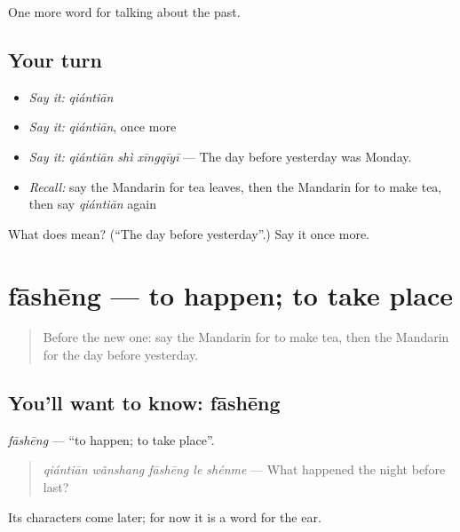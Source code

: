 \begin{grammarlens}[title={What you've built}]
One more word for talking about the past.
\end{grammarlens}

\subsection*{Your turn}
\begin{itemize}
\raggedright
  \item \emph{Say it:} \emph{qiántiān}
  \item \emph{Say it:} \emph{qiántiān}, once more
  \item \emph{Say it:} \emph{qiántiān shì xīngqīyī} — The day before yesterday was Monday.
  \item \emph{Recall:} say the Mandarin for tea leaves, then the Mandarin for to make tea, then say \emph{qiántiān} again
\end{itemize}

\begin{tcolorbox}[breakable,colback=teal!4,colframe=teal!35!black,title={Before you move on}]
What does  mean? (\textquotedblleft{}The day before yesterday\textquotedblright{}.) Say it once more.
\end{tcolorbox}
\section[fāshēng]{fāshēng — to happen; to take place}

\label{lesson:ZH-C167-fasheng}



\begin{quote}
Before the new one: say the Mandarin for to make tea, then the Mandarin for the day before yesterday.
\end{quote}

\subsection*{You'll want to know: fāshēng}
\emph{fāshēng} — \textquotedblleft{}to happen; to take place\textquotedblright{}.

\begin{quote}
\emph{qiántiān wǎnshang fāshēng le shénme} — What happened the night before last?
\end{quote}

Its characters come later; for now it is a word for the ear.


